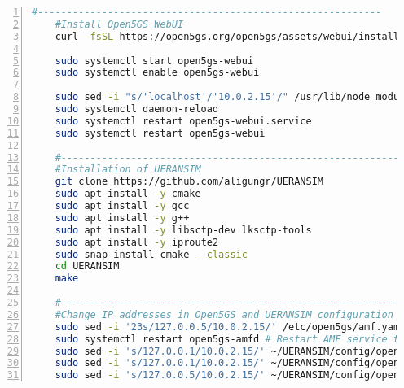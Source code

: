 \begin{lstlisting}[basicstyle=\small, frame=single, breaklines=true, postbreak=\mbox{\textcolor{red}{$\hookrightarrow$}\space}, escapeinside ={\%,}, escapechar={!}, numbers=left, language=sh, caption=Script]
    #-----------------------------------------------------------
    #Install Open5GS WebUI
    curl -fsSL https://open5gs.org/open5gs/assets/webui/install | sudo -E bash -

    sudo systemctl start open5gs-webui
    sudo systemctl enable open5gs-webui

    sudo sed -i "s/'localhost'/'10.0.2.15'/" /usr/lib/node_modules/open5gs/server/index.js # Change localhost
    sudo systemctl daemon-reload
    sudo systemctl restart open5gs-webui.service
    sudo systemctl restart open5gs-webui

    #-----------------------------------------------------------
    #Installation of UERANSIM
    git clone https://github.com/aligungr/UERANSIM
    sudo apt install -y cmake
    sudo apt install -y gcc
    sudo apt install -y g++
    sudo apt install -y libsctp-dev lksctp-tools
    sudo apt install -y iproute2
    sudo snap install cmake --classic
    cd UERANSIM
    make

    #-----------------------------------------------------------
    #Change IP addresses in Open5GS and UERANSIM configuration files
    sudo sed -i '23s/127.0.0.5/10.0.2.15/' /etc/open5gs/amf.yaml # Change AMF IP address
    sudo systemctl restart open5gs-amfd # Restart AMF service to apply changes
    sudo sed -i 's/127.0.0.1/10.0.2.15/' ~/UERANSIM/config/open5gs-ue.yaml # Change UE IP address
    sudo sed -i 's/127.0.0.1/10.0.2.15/' ~/UERANSIM/config/open5gs-gnb.yaml # Change gNB IP address
    sudo sed -i 's/127.0.0.5/10.0.2.15/' ~/UERANSIM/config/open5gs-gnb.yaml # Change gNB AMF IP address
\end{lstlisting}
